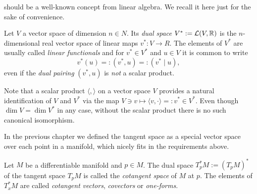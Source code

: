  should be a well-known concept from linear algebra. We recall it here just for the sake of convenience.

\begin{definition}
  Let $V$ a vector space of dimension $n\in N$.
  Its \emph{dual space} $V^* := \mathcal{L}(V, \mathbb{R})$ is the $n$-dimensional real vector space of linear maps $v^*:V \to R$.
  The elements of $V^*$ are usually called \emph{linear functionals} and for $v^*\in V^*$ and $u\in V$ it is common to write
  \begin{equation}
    v^*(u) =: (v^*, u) =: (v^* \mid u),
  \end{equation}
  even if the \emph{dual pairing} $(v^*, u)$ is \emph{not} a scalar product.
\end{definition}

Note that a scalar product $\langle,\rangle$ on a vector space $V$ provides a natural identification of $V$ and $V^*$ via the map $V\ni v \mapsto \langle v, \cdot \rangle =: v^* \in V^*$.
Even though $\dim V = \dim V^*$ in any case, without the scalar product there is no such canonical isomorphism.

In the previous chapter we defined the tangent space as a special vector space over each point in a manifold, which nicely fits in the requirements above.

\begin{definition}
  Let $M$ be a differentiable manifold and $p\in M$.
  The dual space $T_p^*M := (T_pM)^*$ of the tangent space $T_pM$ is called the \emph{cotangent space} of $M$ at $p$.
  The elements of $T^*_xM$ are called \emph{cotangent vectors}, \emph{covectors} or \emph{one-forms}.
\end{definition}

\begin{example}
  \TODO
\end{example}